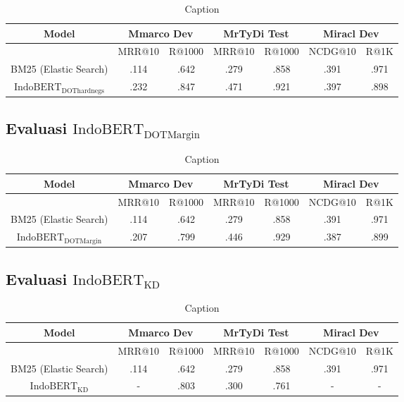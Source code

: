 \begin{table}
    \centering
    \caption{Caption}
    \label{tab:indobertdothardnegs}
    \begin{tabular}{|c|cc|cc|cc|} \hline 
         Model&  \multicolumn{2}{|c|}{Mmarco Dev}& 
         \multicolumn{2}{|c|}{MrTyDi Test}&  \multicolumn{2}{|c|}{Miracl Dev}\\ \hline 
            & MRR@10 & R@1000 & MRR@10 & R@1000 & NCDG@10 & R@1K\\ \hline 
            BM25 (Elastic Search) & .114 & .642 & .279 & .858 & .391 & .971\\ \hline
            $\text{IndoBERT}_{\text{DOThardnegs}}$ & .232 & .847 & .471 & .921 & .397 & .898\\ \hline
    \end{tabular}
\end{table}

\subsection{Evaluasi $\text{IndoBERT}_{\text{DOTMargin}}$}
\label{sec:resultindobertdotmargin}

\begin{table}
    \centering
    \caption{Caption}
    \label{tab:indobertdotmargin}
    \begin{tabular}{|c|cc|cc|cc|} \hline 
         Model&  \multicolumn{2}{|c|}{Mmarco Dev}& 
         \multicolumn{2}{|c|}{MrTyDi Test}&  \multicolumn{2}{|c|}{Miracl Dev}\\ \hline 
            & MRR@10 & R@1000 & MRR@10 & R@1000 & NCDG@10 & R@1K\\ \hline 
            BM25 (Elastic Search) & .114 & .642 & .279 & .858 & .391 & .971\\ \hline
            $\text{IndoBERT}_{\text{DOTMargin}}$ & .207 & .799 & .446 & .929 & .387 & .899\\ \hline            
    \end{tabular}
\end{table}

\subsection{Evaluasi $\text{IndoBERT}_{\text{KD}}$}
\label{sec:resultindobertkd}

\begin{table}
    \centering
    \caption{Caption}
    \label{tab:indobertkd}
    \begin{tabular}{|c|cc|cc|cc|} \hline 
         Model&  \multicolumn{2}{|c|}{Mmarco Dev}& 
         \multicolumn{2}{|c|}{MrTyDi Test}&  \multicolumn{2}{|c|}{Miracl Dev}\\ \hline 
            & MRR@10 & R@1000 & MRR@10 & R@1000 & NCDG@10 & R@1K\\ \hline 
            BM25 (Elastic Search) & .114 & .642 & .279 & .858 & .391 & .971\\ \hline
            $\text{IndoBERT}_{\text{KD}}$ & - & .803 & .300 & .761 & - & -\\ \hline
    \end{tabular}
\end{table}

